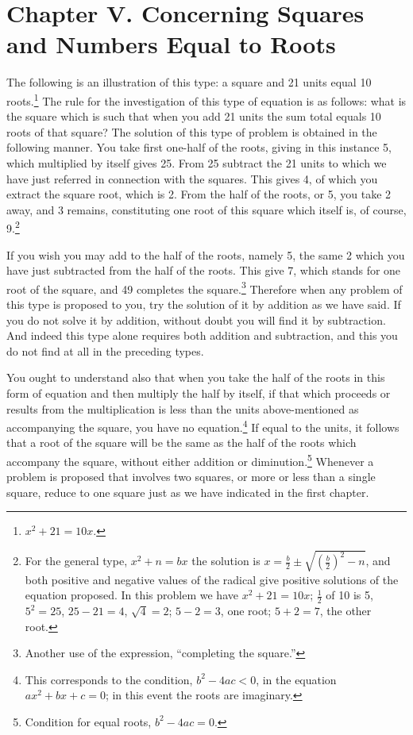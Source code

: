 \documentclass[11pt,a4paper]{book}
\begin{document}
\section*{Chapter V. Concerning Squares and Numbers Equal to Roots}

The following is an illustration of this type: a square and 21 units equal 10 roots.\footnote{$x^2 + 21 = 10x$.} The rule for the investigation of this type of equation is as follows: what is the square which is such that when you add 21 units the sum total equals 10 roots of that square? The solution of this type of problem is obtained in the following manner. You take first one-half of the roots, giving in this instance 5, which multiplied by itself gives 25. From 25 subtract the 21 units to which we have just referred in connection with the squares. This gives 4, of which you extract the square root, which is 2. From the half of the roots, or 5, you take 2 away, and 3 remains, constituting one root of this square which itself is, of course, 9.\footnote{For the general type, $x^2 + n = bx$ the solution is $x = \frac{b}{2} \pm \sqrt{(\frac{b}{2})^2 - n}$, and both positive and negative values of the radical give positive solutions of the equation proposed. In this problem we have $x^2 + 21 = 10x$; $\frac{1}{2}$ of 10 is 5, $5^2 = 25$, $25 - 21 = 4$, $\sqrt{4} = 2$; $5 - 2 = 3$, one root; $5 + 2 = 7$, the other root.}

If you wish you may add to the half of the roots, namely 5, the same 2 which you have just subtracted from the half of the roots. This give 7, which stands for one root of the square, and 49 completes the square.\footnote{Another use of the expression, ``completing the square.''} Therefore when any problem of this type is proposed to you, try the solution of it by addition as we have said. If you do not solve it by addition, without doubt you will find it by subtraction. And indeed this type alone requires both addition and subtraction, and this you do not find at all in the preceding types.

You ought to understand also that when you take the half of the roots in this form of equation and then multiply the half by itself, if that which proceeds or results from the multiplication is less than the units above-mentioned as accompanying the square, you have no equation.\footnote{This corresponds to the condition, $b^2 - 4ac < 0$, in the equation $ax^2 + bx + c = 0$; in this event the roots are imaginary.} If equal to the units, it follows that a root of the square will be the same as the half of the roots which accompany the square, without either addition or diminution.\footnote{Condition for equal roots, $b^2 - 4ac = 0$.} Whenever a problem is proposed that involves two squares, or more or less than a single square, reduce to one square just as we have indicated in the first chapter.
\end{document}

